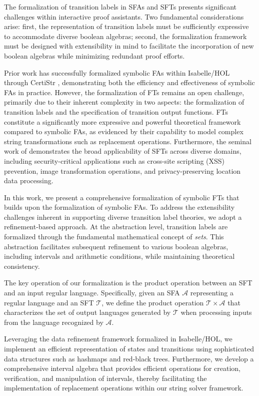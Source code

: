 \documentclass[a4paper,UKenglish,cleveref, autoref, anonymous, thm-restate]{lipics-v2021}
\begin{document}
The formalization of transition labels in SFAs and SFTs presents significant challenges within interactive proof assistants. Two fundamental considerations arise: first, the representation of transition labels must be sufficiently expressive to accommodate diverse boolean algebras; second, the formalization framework must be designed with extensibility in mind to facilitate the incorporation of new boolean algebras while minimizing redundant proof efforts.




Prior work has successfully formalized symbolic FAs within Isabelle/HOL through CertiStr \cite{cpp/KanLRS22}, demonstrating both the efficiency and effectiveness of symbolic FAs in practice. However, the formalization of FTs remains an open challenge, primarily due to their inherent complexity in two aspects: the formalization of transition labels and the specification of transition output functions. FTs constitute a significantly more expressive and powerful theoretical framework compared to symbolic FAs, as evidenced by their capability to model complex string transformations such as replacement operations.
Furthermore, the seminal work of \cite{VeanesHLMB12Transducer} demonstrates the broad applicability of SFTs across diverse domains, including security-critical applications such as cross-site scripting (XSS) prevention, image transformation operations, and privacy-preserving location data processing.


 
In this work, we present a comprehensive formalization of symbolic FTs that builds upon the formalization of symbolic FAs. To address the extensibility challenges inherent in supporting diverse transition label theories, we adopt a refinement-based approach. At the abstraction level, transition labels are formalized through the fundamental mathematical concept of \emph{sets}. This abstraction facilitates subsequent refinement to various boolean algebras, including intervals and arithmetic conditions, while maintaining theoretical consistency.

The key operation of our formalization is the product operation between an SFT and an input regular language. Specifically, given an SFA $\mathcal{A}$ representing a regular language and an SFT $\mathcal{T}$, we define the product operation $\mathcal{T} \times\mathcal{A}$ that characterizes the set of output languages generated by $\mathcal{T}$ when processing inputs from the language recognized by $\mathcal{A}$.


Leveraging the data refinement framework \cite{DBLP:conf/itp/Lammich13} formalized in Isabelle/HOL, we implement an efficient representation of states and transitions using sophisticated data structures such as hashmaps and red-black trees. Furthermore, we develop a comprehensive interval algebra that provides efficient operations for creation, verification, and manipulation of intervals, thereby facilitating the implementation of replacement operations within our string solver framework. 
\end{document}
